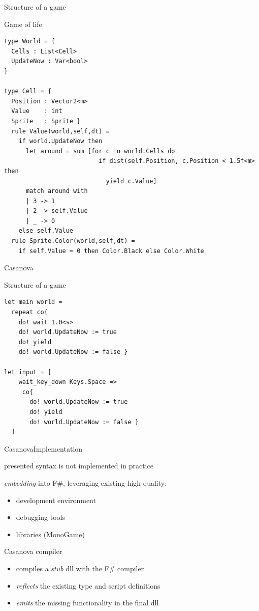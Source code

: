 \documentclass{beamer}
\begin{document}
\begin{frame}[fragile]{Structure of a game}
\begin{block}{Game of life}
\begin{lstlisting}
type World = { 
  Cells : List<Cell> 
  UpdateNow : Var<bool> 
}

type Cell = { 
  Position : Vector2<m>
  Value    : int 
  Sprite   : Sprite }
  rule Value(world,self,dt) = 
    if world.UpdateNow then 
      let around = sum [for c in world.Cells do 
                          if dist(self.Position, c.Position < 1.5f<m> then 
                            yield c.Value] 
      match around with 
      | 3 -> 1 
      | 2 -> self.Value 
      | _ -> 0 
    else self.Value 
  rule Sprite.Color(world,self,dt) = 
    if self.Value = 0 then Color.Black else Color.White
\end{lstlisting}
\end{block}
\end{frame}
\begin{frame}[fragile]{Casanova}
\begin{block}{Structure of a game}
\begin{lstlisting}
let main world = 
  repeat co{ 
    do! wait 1.0<s> 
    do! world.UpdateNow := true 
    do! yield 
    do! world.UpdateNow := false } 

let input = [
    wait_key_down Keys.Space =>
     co{
       do! world.UpdateNow := true
       do! yield
       do! world.UpdateNow := false }
  ]
\end{lstlisting}
\end{block}
\end{frame}

\begin{slide}{Casanova}{Implementation}{
\item presented syntax is not implemented in practice
\item \textit{embedding} into F\#, leveraging existing high quality:
\begin{itemize}
\item development environment
\item debugging tools
\item libraries (MonoGame)
\end{itemize}
\item Casanova compiler
\begin{itemize}
\item compiles a \textit{stub} dll with the F\# compiler
\item \textit{reflects} the existing type and script definitions
\item \textit{emits} the missing functionality in the final dll
\end{itemize}
}\end{slide}
\end{document}
